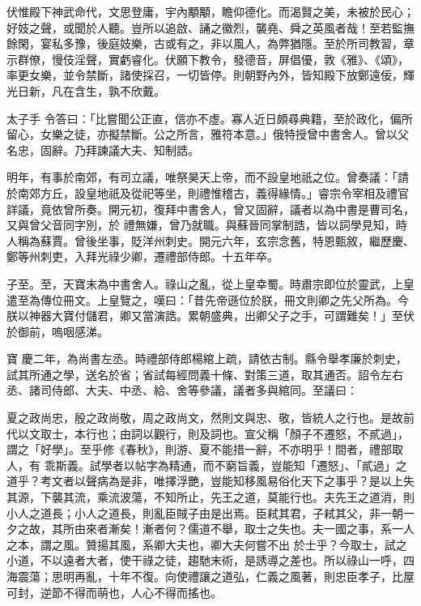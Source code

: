 \begin{pinyinscope}
 伏惟殿下神武命代，文思登庸，宇內顒顒，瞻仰德化。而渴賢之美，未被於民心；好妓之聲，或聞於人聽。豈所以追啟、誦之徽烈，襲堯、舜之英風者哉！至若監撫餘閑，宴私多豫，後庭妓樂，古或有之，非以風人，為弊猶隱。至於所司教習，章示群僚，慢伎淫聲，實虧睿化。伏願下教令，發德音，屏倡優，敦《雅》、《頌》，率更女樂，並令禁斷，諸使採召，一切皆停。則朝野內外，皆知殿下放鄭遠佞，輝光日新，凡在含生，孰不欣戴。



 太子手
 令答曰：「比嘗聞公正直，信亦不虛。寡人近日頗尋典籍，至於政化，偏所留心，女樂之徒，亦擬禁斷。公之所言，雅符本意。」俄特授曾中書舍人。曾以父名忠，固辭。乃拜諫議大夫、知制誥。



 明年，有事於南郊，有司立議，唯祭昊天上帝，而不設皇地祇之位。曾奏議：「請於南郊方丘，設皇地祇及從祀等坐，則禮惟稽古，義得緣情。」睿宗令宰相及禮官詳議，竟依曾所奏。開元初，復拜中書舍人，曾又固辭，議者以為中書是曹司名，又與曾父音同字別，於
 禮無嫌，曾乃就職。與蘇晉同掌制誥，皆以詞學見知，時人稱為蘇賈。曾後坐事，貶洋州刺史。開元六年，玄宗念舊，特恩甄敘，繼歷慶、鄭等州刺吏，入拜光祿少卿，遷禮部侍郎。十五年卒。



 子至。至，天寶末為中書舍人。祿山之亂，從上皇幸蜀。時肅宗即位於靈武，上皇遣至為傳位冊文。上皇覽之，嘆曰：「昔先帝遜位於朕，冊文則卿之先父所為。今朕以神器大寶付儲君，卿又當演誥。累朝盛典，出卿父子之手，可謂難矣！」至伏於御前，嗚咽感涕。



 寶
 慶二年，為尚書左丞。時禮部侍郎楊綰上疏，請依古制。縣令舉孝廉於刺史，試其所通之學，送名於省；省試每經問義十條、對策三道，取其通否。詔令左右丞、諸司侍郎、大夫、中丞、給、舍等參議，議者多與綰同。至議曰：



 夏之政尚忠，殷之政尚敬，周之政尚文，然則文與忠、敬，皆統人之行也。是故前代以文取士，本行也；由詞以觀行，則及詞也。宣父稱「顏子不遷怒，不貳過」，謂之「好學」。至乎修《春秋》，則游、夏不能措一辭，不亦明乎！間者，禮部取人，有
 乖斯義。試學者以帖字為精通，而不窮旨義，豈能知「遷怒」、「貳過」之道乎？考文者以聲病為是非，唯擇浮艷，豈能知移風易俗化天下之事乎？是以上失其源，下襲其流，乘流波蕩，不知所止，先王之道，莫能行也。夫先王之道消，則小人之道長；小人之道長，則亂臣賊子由是出焉。臣弒其君，子弒其父，非一朝一夕之故，其所由來者漸矣！漸者何？儒道不舉，取士之失也。夫一國之事，系一人之本，謂之風。贊揚其風，系卿大夫也，卿大夫何嘗不出
 於士乎？今取士，試之小道，不以遠者大者，使干祿之徒，趨馳末術，是誘導之差也。所以祿山一呼，四海震蕩；思明再亂，十年不復。向使禮讓之道弘，仁義之風著，則忠臣孝子，比屋可封，逆節不得而萌也，人心不得而搖也。




\end{pinyinscope}
